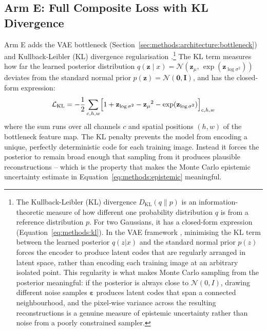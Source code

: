 \documentclass[12pt, a4paper, twoside, openright]{book}
\begin{document}
\subsection{Arm E: Full Composite Loss with KL Divergence}
\label{sec:methods:loss:composite}

Arm E adds the VAE bottleneck (Section~\ref{sec:methods:architecture:bottleneck}) and Kullback-Leibler (KL) divergence regularisation \cite{kullback_information_1951}.\footnote{The Kullback-Leibler (KL) divergence $D_{\mathrm{KL}}(q \| p)$ is an information-theoretic measure of how different one probability distribution $q$ is from a reference distribution $p$. For two Gaussians, it has a closed-form expression (Equation~\ref{eq:methods:kl}). In the VAE framework \cite{kingma_auto-encoding_2014}, minimising the KL term between the learned posterior $q(z|x)$ and the standard normal prior $p(z)$ forces the encoder to produce latent codes that are regularly arranged in latent space, rather than encoding each training image at an arbitrary isolated point. This regularity is what makes Monte Carlo sampling from the posterior meaningful: if the posterior is always close to $\mathcal{N}(0,I)$, drawing different noise samples $\boldsymbol{\varepsilon}$ produces latent codes that span a connected neighbourhood, and the pixel-wise variance across the resulting reconstructions is a genuine measure of epistemic uncertainty rather than noise from a poorly constrained sampler.} The KL term measures how far the learned posterior
distribution $q(\mathbf{z} \mid x) = \mathcal{N}(\mathbf{z}_\mu,\,\exp(\mathbf{z}_{\log\sigma^2}))$
deviates from the standard normal prior $p(\mathbf{z}) = \mathcal{N}(\mathbf{0}, \mathbf{I})$,
and has the closed-form expression:
\begin{equation}
\label{eq:methods:kl}
\mathcal{L}_{\mathrm{KL}} = -\frac{1}{2}\sum_{c,h,w}
  \Bigl[1 + {\mathbf{z}_{\log\sigma^2}} - {\mathbf{z}_\mu}^2
  - \exp({\mathbf{z}_{\log\sigma^2}})\Bigr]_{c,h,w}
\end{equation}
where the sum runs over all channels $c$ and spatial positions $(h,w)$ of the bottleneck
feature map. The KL penalty prevents the model from encoding a unique, perfectly
deterministic code for each training image. Instead it forces the posterior to remain broad
enough that sampling from it produces plausible reconstructions -- which is the property
that makes the Monte Carlo epistemic uncertainty estimate in
Equation~\ref{eq:methods:epistemic} meaningful.
\end{document}

